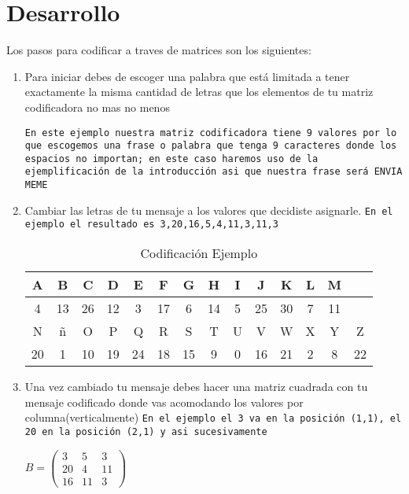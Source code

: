 \documentclass[12pt,letterpaper]{report}
\begin{document}
\section*{Desarrollo}
Los pasos para codificar a traves de matrices son los siguientes:
\begin{enumerate}
\item Para iniciar debes de escoger una palabra que está limitada a tener exactamente la misma cantidad de letras que los elementos de tu matriz codificadora no mas no menos 

\texttt{En este ejemplo nuestra matriz codificadora tiene 9 valores por lo que escogemos una frase o palabra que tenga 9 caracteres donde los espacios no importan; en este caso haremos uso de la ejemplificación de la introducción asi que nuestra frase será ENVIA MEME}

\item Cambiar las letras de tu mensaje a los valores que decidiste asignarle.
\texttt{En el ejemplo el resultado es 3,20,16,5,4,11,3,11,3}

\begin{table}[h]
\begin{center}
\caption{Codificación Ejemplo} 
\begin{tabular}{|c|c|c|c|c|c|c|c|c|c|c|c|c|c|}
\hline
A & B & C & D & E & F & G & H & I & J & K & L & M & \\ \hline
4 & 13 & 26 & 12 & 3 & 17 & 6 & 14 & 5 & 25 & 30 & 7 & 11\\ \hline
N & ñ & O & P & Q & R & S & T & U & V & W & X & Y & Z\\ \hline
20 & 1 & 10 & 19 & 24 & 18 & 15 & 9 & 0 & 16 & 21 & 2 & 8 & 22\\ \hline
\end{tabular}
\end{center}
\end{table}

\item Una vez cambiado tu mensaje debes hacer una matriz cuadrada con tu mensaje codificado donde vas acomodando los valores por columna(verticalmente)
\texttt{En el ejemplo el 3 va en la posición (1,1), el 20 en la posición (2,1) y asi sucesivamente}

\begin{center}
$B =
\begin{pmatrix}
3 & 5 & 3\\
20 & 4 & 11\\
16 & 11 & 3
\end{pmatrix}
$


\end{center}
\end{enumerate}
\end{document}
